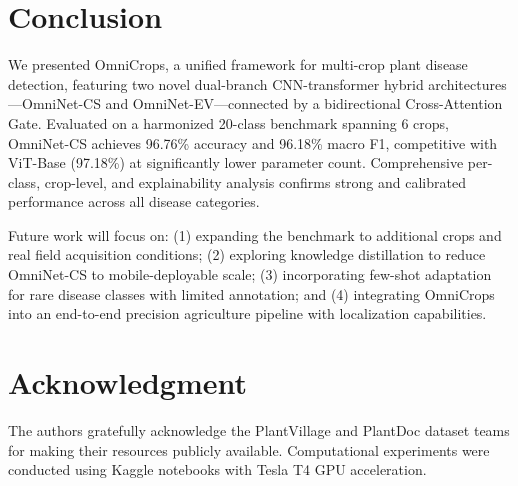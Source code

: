 \documentclass[conference]{IEEEtran}
\begin{document}
\section{Conclusion}
\label{sec:conclusion}

We presented OmniCrops, a unified framework for multi-crop plant disease detection, featuring two novel dual-branch CNN-transformer hybrid architectures—OmniNet-CS and OmniNet-EV—connected by a bidirectional Cross-Attention Gate. Evaluated on a harmonized 20-class benchmark spanning 6 crops, OmniNet-CS achieves 96.76\% accuracy and 96.18\% macro F1, competitive with ViT-Base (97.18\%) at significantly lower parameter count. Comprehensive per-class, crop-level, and explainability analysis confirms strong and calibrated performance across all disease categories.

Future work will focus on: (1) expanding the benchmark to additional crops and real field acquisition conditions; (2) exploring knowledge distillation to reduce OmniNet-CS to mobile-deployable scale; (3) incorporating few-shot adaptation for rare disease classes with limited annotation; and (4) integrating OmniCrops into an end-to-end precision agriculture pipeline with localization capabilities.

\section*{Acknowledgment}
The authors gratefully acknowledge the PlantVillage and PlantDoc dataset teams for making their resources publicly available. Computational experiments were conducted using Kaggle notebooks with Tesla T4 GPU acceleration.



\end{document}
